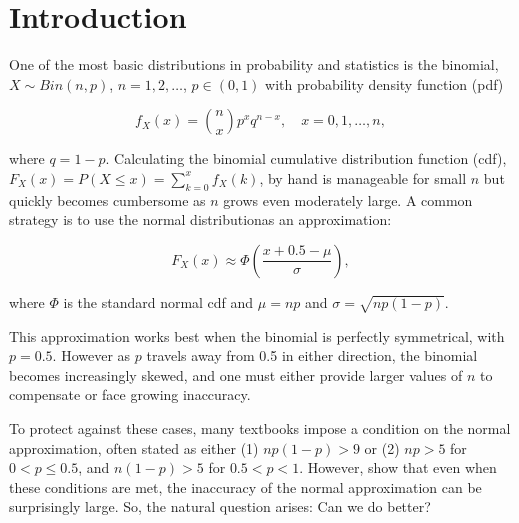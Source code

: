 \section{Introduction}

One of the most basic distributions in probability and statistics is the
binomial, $X \sim Bin(n,p)$, $n = 1, 2, \ldots$, $p \in (0, 1)$ with
probability density function (pdf)

\begin{equation*}
  f_X(x) = \binom{n}{x} p^x q^{n-x}, \quad x = 0, 1, \ldots, n,
\end{equation*}

where $q=1-p$. Calculating the binomial cumulative distribution function (cdf),
$F_X(x) = P(X \leq x) = \sum_{k=0}^x f_X(k)$, by hand is manageable for small
$n$ but quickly becomes cumbersome as $n$ grows even moderately large. A common
strategy is to use the normal distribution\footnotemark as an approximation:


\begin{equation}
  F_X(x) \approx \Phi \left( \frac{x + 0.5 - \mu}{\sigma} \right),
\end{equation}

where $\Phi$ is the standard normal cdf and $\mu = np$ and $\sigma =
\sqrt{np(1-p)}$.

This approximation works best when the binomial is perfectly symmetrical, with
$p=0.5$. However as $p$ travels away from 0.5 in either direction, the binomial
becomes increasingly skewed, and one must either provide larger values of $n$
to compensate or face growing inaccuracy.

To protect against these cases, many textbooks impose a condition on the normal
approximation, often stated as either (1) $np(1-p) > 9$ \; or \; (2) $np > 5$
for $0 < p \leq 0.5$, and $n(1-p) > 5$ for $0.5 < p < 1$. However, \citet{mabs}
show that even when these conditions are met, the inaccuracy of the normal
approximation can be surprisingly large. So, the natural question arises: Can
we do better?

